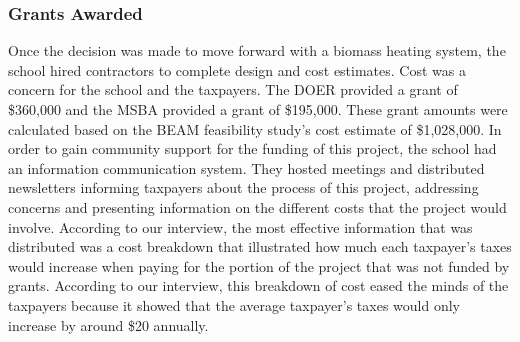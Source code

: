 \subsubsection{Grants Awarded}
\par Once the decision was made to move forward with a biomass heating system, the school hired contractors to complete design and cost estimates. Cost was a concern for the school and the taxpayers. The DOER provided a grant of \$360,000 and the MSBA provided a grant of \$195,000. These grant amounts were calculated based on the BEAM feasibility study’s cost estimate of \$1,028,000. In order to gain community support for the funding of this project, the school had an information communication system. They hosted meetings and distributed newsletters informing taxpayers about the process of this project, addressing concerns and presenting information on the different costs that the project would involve. According to our interview, the most effective information that was distributed was a cost breakdown that illustrated how much each taxpayer’s taxes would increase when paying for the portion of the project that was not funded by grants. According to our interview, this breakdown of cost eased the minds of the taxpayers because it showed that the average taxpayer’s taxes would only increase by around \$20 annually.

